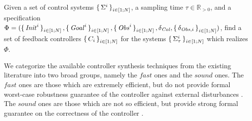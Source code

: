 \begin{comment}
 \item for \emph{every} $k\leq K$ and every $1\leq i\le N$ we have $D(x^i_k,obs)>\delta_{\obs}$.
 
 \end{itemize}
 For a given control system $\Sigma$, the targetted problem is denoted by a tuple $(x_0, \reach,\obs, \delta_{\obs},\delta_{\col})$. In linear temporal logic (LTL) notation \cite{baier2008principles}, the above conditions can be succinctly written as:
\begin{equation}\label{eq:spec}
	x_0 \wedge ([\bigwedge_{1\leq i\leq N}D(x^i,\obs)>\delta_{obs}\; \bigwedge_{1\leq i,j\leq N\;i\neq j}  d(x^i,x^j)>\delta_{\col}]\; \mathcal{U}\;\reach) .
\end{equation}
\end{comment}

\begin{problem}\label{prob:reach-avoid}
	Given a set of control systems $\set{\Sigma^i}_{i\in [1;N]}$, a sampling time $\tau\in \mathbb{R}_{>0}$, and a specification $\Phi=(\set{\mathit{Init}^i}_{i\in [1;N]}, \set{\mathit{Goal}^i}_{i\in [1;N]}, \set{\mathit{Obs}^i}_{i\in [1;N]}, \delta_{\mathit{Col}}, \set{\delta_{\mathit{Obs},i}}_{i\in [1;N]})$, find a set of feedback controllers $\set{C_i}_{i\in [1;N]}$ for the systems $\set{\Sigma_\tau^i}_{i\in [1;N]}$ which realizes $\Phi$.
\end{problem}


We categorize the available controller synthesis techniques from the existing literature into two broad groups, namely the $\mathit{fast}$ ones and the $\mathit{sound}$ ones.
The $\mathit{fast}$ ones are those which are extremely efficient, but do not provide formal worst-case robustness guarantee of the controller against external disturbances \cite{howell2019altro,choset2005principles}.
The $\mathit{sound}$ ones are those which are not so efficient, but provide strong formal guarantee on the correctness of the controller \cite{reissig2016feedback,fisac2015reach,tedrake2009lqr}.

